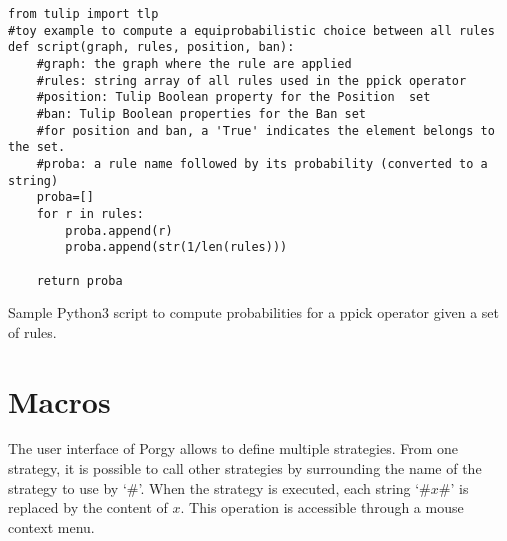 \documentclass[a4paper,10pt,runningheads]{llncs}
\newcommand{\PORGY}{{\sc Porgy}\xspace}
\newcommand{\set}[2]{{\tt update(}#1\{#2\}{\tt )}}
\begin{document}
\begin{listing}[!ht]
\begin{verbatim}
from tulip import tlp
#toy example to compute a equiprobabilistic choice between all rules
def script(graph, rules, position, ban): 
	#graph: the graph where the rule are applied
	#rules: string array of all rules used in the ppick operator
	#position: Tulip Boolean property for the Position  set
	#ban: Tulip Boolean properties for the Ban set
	#for position and ban, a 'True' indicates the element belongs to the set.
	#proba: a rule name followed by its probability (converted to a string)
	proba=[] 
	for r in rules:
		proba.append(r)
		proba.append(str(1/len(rules)))

	return proba
\end{verbatim}
\caption{Sample Python3 script to compute probabilities for a ppick operator given a set 
of rules.}
\label{code:python}
\end{listing}

\section*{Macros}
The user interface of \PORGY allows to define multiple strategies. From one strategy, it is possible to call other strategies by surrounding the name of the strategy to use by `\#'. %
When the strategy is executed, each string `\#$x$\#' is replaced by the content of $x$. This operation is accessible through a mouse context menu.


\end{document}
